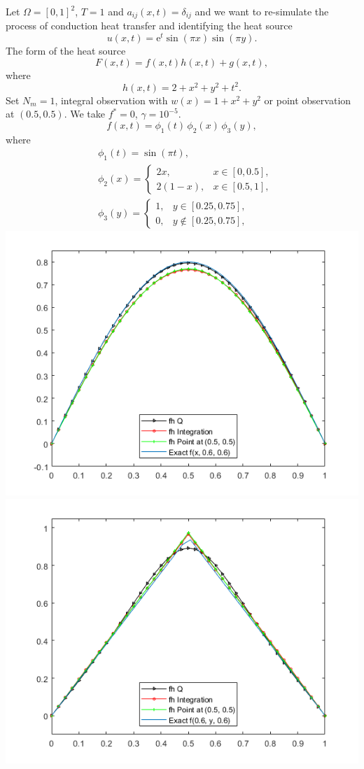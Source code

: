 \documentclass[]{article}
\begin{document}
Let $\Omega=[0, 1]^2$, $T=1$ and
$a_{ij}(x, t)=\delta_{ij}$ and we want to re-simulate the process of conduction heat transfer and identifying the heat source
$$u(x, t)=\text{e}^t\sin(\pi x) \sin(\pi y).$$
The form of the heat source
$$F(x, t)=f(x, t)h(x, t)+g(x, t),$$
where
$$h(x, t)=2+x^2+y^2+t^2.$$
Set $N_m=1$, integral observation with $w(x)=1+x^2+y^2$ or point observation at $(0.5, 0.5)$. We take $f^*=0$, $\gamma=10^{-5}$.
$$f(x, t)=\phi_1(t)\,\phi_2(x)\,\phi_3(y),$$
where
\begin{align*}
	&\phi_1(t)=\sin(\pi t),\\
	&\phi_2(x)=
		\begin{cases}
			2x, & x\in [0, 0.5],\\
			2(1-x), & x \in [0.5, 1],
		\end{cases}\\
	&\phi_3(y)=
		\begin{cases}
			1, & y\in [0.25, 0.75],\\
			0, & y \notin [0.25, 0.75],
		\end{cases}
\end{align*}
\centering
\includegraphics[width=0.75\linewidth]{../FreeFem++/fhx}\\
\includegraphics[width=0.75\linewidth]{../FreeFem++/fhy}\\
\end{document}
